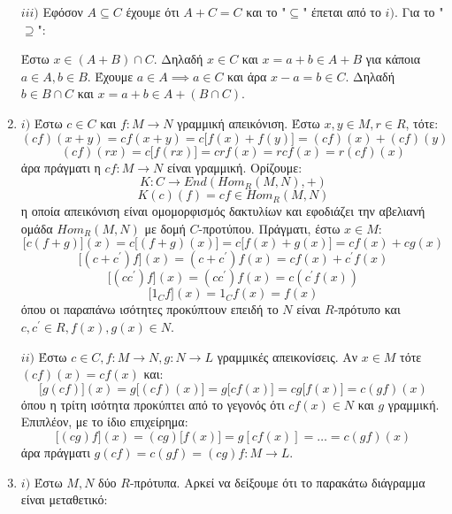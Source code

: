 \documentclass{article}
\begin{document}
\begin{enumerate}
		$iii)$ Εφόσον $A \subseteq C$ έχουμε ότι $A+C = C$ και το "$\subseteq$" έπεται από το $i)$. Για το "$\supseteq$":

		Έστω $x \in (A+B) \cap C$. Δηλαδή $x \in C$ και $x = a + b \in A + B$ για κάποια $a \in A, b \in B$. Έχουμε $a \in A \implies a \in C$ και άρα $x - a = b \in C$. Δηλαδή $b \in B\cap C$ και $x = a + b \in A + (B\cap C)$.
		$ $\newline

	\item $i)$ Έστω $c \in C$ και $f : M \rightarrow N$ γραμμική απεικόνιση. Έστω $x,y \in M, r \in R$, τότε:
		$$(cf)(x+y) = cf(x+y) = c\big[f(x) + f(y)\big] = (cf)(x) + (cf)(y)$$
		$$(cf)(rx) =  c\big[f(rx)\big] = crf(x) = rcf(x) = r(cf)(x)$$
		άρα πράγματι η $cf: M \rightarrow N$ είναι γραμμική. Ορίζουμε:
		$$K: C \rightarrow End(Hom_R(M,N),+)$$
		$$K(c)(f) = cf \in Hom_R (M,N)$$
		η οποία απεικόνιση είναι ομομορφισμός δακτυλίων και εφοδιάζει την αβελιανή ομάδα $Hom_R (M,N)$ με δομή $C$-προτύπου. Πράγματι, έστω $x \in M$:
		$$\big[c(f+g)\big](x) = c\big[(f+g)(x)\big] = c\big[f(x) + g(x)\big] = cf(x) + cg(x)$$
		$$\big[(c + c^{\prime})f \big](x) = (c+ c^{\prime} ) f(x) = cf(x) + c^{\prime} f(x)  $$
		$$\big[(c c^{\prime}) f\big](x) = (c c^{\prime}) f(x) = c ( c^{\prime} f(x)) $$
		$$\big[1_C f\big] (x) = 1_C f(x) = f(x) $$
		όπου οι παραπάνω ισότητες προκύπτουν επειδή το $N$ είναι $R$-πρότυπο και $c,c^{\prime} \in R, f(x),g(x) \in N$.
		$ $\newline

		$ii)$ Έστω $c \in C, f: M \rightarrow N , g:N \rightarrow L$ γραμμικές απεικονίσεις. Αν $x \in M$ τότε $(cf)(x) = cf(x)$ και:
		$$\big[g(cf)\big](x) = g\big[(cf)(x)\big] = g\big[cf(x)\big] = c g\big[f(x) \big] = c (gf)(x)   $$
		όπου η τρίτη ισότητα προκύπτει από το γεγονός ότι $cf(x) \in N$ και $g$ γραμμική. Επιπλέον, με το ίδιο επιχείρημα:
		$$\big[(cg)f\big](x) = (cg) \big[ f(x) \big] = g[cf(x)] = \ldots = c (gf)(x)$$
		άρα πράγματι $g(cf)=c(gf) = (cg)f : M \rightarrow L$.
		$ $\newline

	\item $i)$ Έστω $M,N$ δύο $R$-πρότυπα. Αρκεί να δείξουμε ότι το παρακάτω διάγραμμα είναι μεταθετικό:
		\begin{center}
		\end{center}
		

\end{enumerate}
\end{document}
